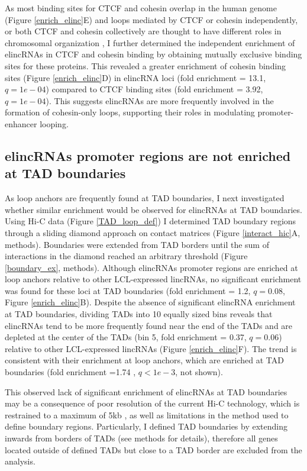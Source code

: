 \documentclass[11pt,a4paper]{report}
\begin{document}
As most binding sites for CTCF and cohesin overlap in the human genome (Figure \ref{enrich_elinc}E) and loops mediated by CTCF or cohesin independently, or both CTCF and cohesin collectively are thought to have different roles in chromosomal organization \cite{Ji2016}⁠, I further determined the independent enrichment of elincRNAs in CTCF and cohesin binding by obtaining mutually exclusive binding sites for these proteins. This revealed a greater enrichment of cohesin binding sites (Figure \ref{enrich_elinc}D) in elincRNA loci (fold enrichment = 13.1, $q=1e-04$) compared to CTCF binding sites (fold enrichment = 3.92, $q=1e-04$). This suggests elincRNAs are more frequently involved in the formation of cohesin-only loops, supporting their roles in modulating promoter-enhancer looping.

\subsection*{elincRNAs promoter regions are not enriched at TAD boundaries}

As loop anchors are frequently found at TAD boundaries, I next investigated whether similar enrichment would be observed for elincRNAs at TAD boundaries. Using Hi-C data (Figure \ref{TAD_loop_def}) I determined TAD boundary regions through a sliding diamond approach on contact matrices (Figure \ref{interact_hic}A, methods). Boundaries were extended from TAD borders until the sum of interactions in the diamond reached an arbitrary threshold (Figure \ref{boundary_ex}, methods). Although elincRNAs promoter regions are enriched at loop anchors relative to other LCL-expressed lincRNAs, no significant enrichment was found for these loci  at TAD boundaries (fold enrichment = 1.2, $q=0.08$, Figure \ref{enrich_elinc}B). Despite the absence of significant elincRNA enrichment at TAD boundaries, dividing TADs into 10 equally sized bins reveals that elincRNAs tend to be more frequently found near the end of the TADs and are depleted at the center of the TADs (bin 5, fold enrichment = 0.37, $q=0.06$) relative to other LCL-expressed lincRNAs (Figure \ref{enrich_elinc}F). The trend is consistent with their enrichment at loop anchors, which are enriched at TAD boundaries (fold enrichment =1.74 , $q<1e-3$, not shown).

This observed lack of significant enrichment  of elincRNAs at TAD boundaries may be a consequence of poor resolution of the current Hi-C technology, which is restrained to a maximum of 5kb \cite{Rao2014}⁠, as well as limitations in the method used to define boundary regions. Particularly, I defined TAD boundaries by extending inwards from borders of TADs (see methods for details), therefore all genes located outside of defined TADs but close to a TAD border are excluded from the analysis. 
\end{document}

